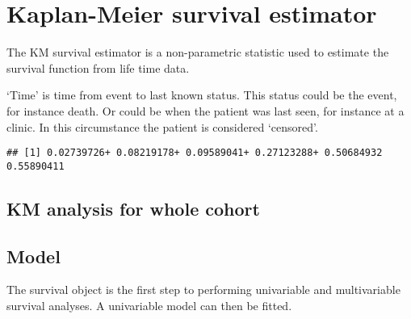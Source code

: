 \documentclass[]{book}
\makeatletter
\newenvironment{Shaded}{\begin{snugshade}}{\end{snugshade}}
\newcommand{\KeywordTok}[1]{\textcolor[rgb]{0.13,0.29,0.53}{\textbf{#1}}}
\newcommand{\DecValTok}[1]{\textcolor[rgb]{0.00,0.00,0.81}{#1}}
\newcommand{\StringTok}[1]{\textcolor[rgb]{0.31,0.60,0.02}{#1}}
\newcommand{\CommentTok}[1]{\textcolor[rgb]{0.56,0.35,0.01}{\textit{#1}}}
\newcommand{\OperatorTok}[1]{\textcolor[rgb]{0.81,0.36,0.00}{\textbf{#1}}}
\newcommand{\NormalTok}[1]{#1}
\newenvironment{kframe}{%
\medskip{}
\setlength{\fboxsep}{.8em}
 \def\at@end@of@kframe{}%
 \ifinner\ifhmode%
  \def\at@end@of@kframe{\end{minipage}}%
  \begin{minipage}{\columnwidth}%
 \fi\fi%
 \def\FrameCommand##1{\hskip\@totalleftmargin \hskip-\fboxsep
 \colorbox{shadecolor}{##1}\hskip-\fboxsep
     \hskip-\linewidth \hskip-\@totalleftmargin \hskip\columnwidth}%
 \MakeFramed {\advance\hsize-\width
   \@totalleftmargin\z@ \linewidth\hsize
   \@setminipage}}%
 {\par\unskip\endMakeFramed%
 \at@end@of@kframe}
\renewenvironment{Shaded}{\begin{kframe}}{\end{kframe}}
\theoremstyle{definition}
\theoremstyle{definition}
\theoremstyle{definition}
\theoremstyle{remark}
\makeatother
\begin{document}
\section{Kaplan-Meier survival
estimator}\label{kaplan-meier-survival-estimator}

The KM survival estimator is a non-parametric statistic used to estimate
the survival function from life time data.

`Time' is time from event to last known status. This status could be the
event, for instance death. Or could be when the patient was last seen,
for instance at a clinic. In this circumstance the patient is considered
`censored'.

\begin{Shaded}
\end{Shaded}

\begin{verbatim}
## [1] 0.02739726+ 0.08219178+ 0.09589041+ 0.27123288+ 0.50684932  0.55890411
\end{verbatim}

\subsection{KM analysis for whole
cohort}\label{km-analysis-for-whole-cohort}

\subsection{Model}\label{model}

The survival object is the first step to performing univariable and
multivariable survival analyses. A univariable model can then be fitted.
\end{document}
